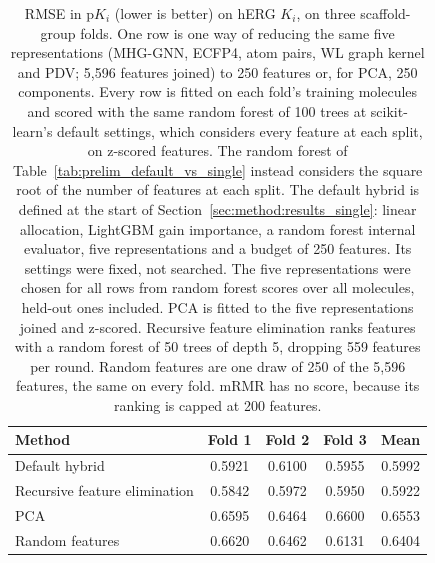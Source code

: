 \begin{table}[htbp]
\centering
\small
\begin{tabular}{@{}lcccc@{}}
\toprule
Method & Fold 1 & Fold 2 & Fold 3 & Mean \\
\midrule
Default hybrid & 0.5921 & 0.6100 & 0.5955 & 0.5992 \\
Recursive feature elimination & 0.5842 & 0.5972 & 0.5950 & 0.5922 \\
PCA & 0.6595 & 0.6464 & 0.6600 & 0.6553 \\
Random features & 0.6620 & 0.6462 & 0.6131 & 0.6404 \\
\bottomrule
\end{tabular}
\caption[The default hybrid against PCA, recursive feature elimination and random features on hERG $K_i$]{RMSE in p$K_i$ (lower is better) on hERG $K_i$, on three scaffold-group folds. One row is one way of reducing the same five representations (MHG-GNN, ECFP4, atom pairs, WL graph kernel and PDV; 5,596 features joined) to 250 features or, for PCA, 250 components. Every row is fitted on each fold's training molecules and scored with the same random forest of 100 trees at scikit-learn's default settings, which considers every feature at each split, on z-scored features. The random forest of Table~\ref{tab:prelim_default_vs_single} instead considers the square root of the number of features at each split. The default hybrid is defined at the start of Section~\ref{sec:method:results_single}: linear allocation, LightGBM gain importance, a random forest internal evaluator, five representations and a budget of 250 features. Its settings were fixed, not searched. The five representations were chosen for all rows from random forest scores over all molecules, held-out ones included. PCA is fitted to the five representations joined and z-scored. Recursive feature elimination ranks features with a random forest of 50 trees of depth 5, dropping 559 features per round. Random features are one draw of 250 of the 5,596 features, the same on every fold. mRMR has no score, because its ranking is capped at 200 features.}
\label{tab:prelim_reduction}
\end{table}

